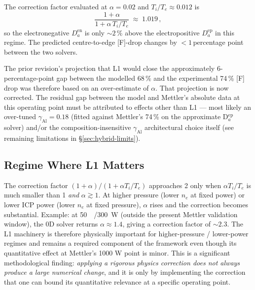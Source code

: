 The correction factor evaluated at $\alpha = 0.02$ and $T_i/T_e \approx
0.012$ is
\[
  \frac{1+\alpha}{1+\alpha\,T_i/T_e} \;\approx\; 1.019\,,
\]
so the electronegative $D_a^\mathrm{en}$ is only $\sim 2\,\%$ above the
electropositive $D_a^\mathrm{ep}$ in this regime.  The predicted
centre-to-edge [F]-drop changes by ${<}1$\,percentage point between the
two solvers.

The prior revision's projection that L1 would close the approximately
6-percentage-point gap between the modelled 68\,\% and the experimental
74\,\% [F] drop was therefore based on an over-estimate of $\alpha$.  That
projection is now corrected.  The residual gap between the model and
Mettler's absolute data at this operating point must be attributed to
effects other than L1 --- most likely an over-tuned
$\gamma_\mathrm{Al} = 0.18$ (fitted against Mettler's 74\,\% on the
approximate D$_a^\mathrm{ep}$ solver) and/or the composition-insensitive
$\gamma_\mathrm{Al}$ architectural choice itself (see remaining
limitations in \S\ref{sec:hybrid-limits}).

\subsection{Regime Where L1 Matters}

The correction factor $(1+\alpha)/(1+\alpha T_i/T_e)$ approaches 2 only
when $\alpha T_i/T_e$ is much smaller than 1 \emph{and} $\alpha \gtrsim 1$.
At higher pressure (lower $n_e$ at fixed power) or lower ICP power (lower
$n_e$ at fixed pressure), $\alpha$ rises and the correction becomes
substantial.  Example: at \SI{50}{\milli\torr}/\SI{300}{\watt} (outside the
present Mettler validation window), the 0D solver returns $\alpha \approx
1.4$, giving a correction factor of $\sim 2.3$.  The L1 machinery is
therefore physically important for higher-pressure / lower-power regimes
and remains a required component of the framework even though its
quantitative effect at Mettler's 1000 W point is minor.  This is a
significant methodological finding: \emph{applying a rigorous physics
correction does not always produce a large numerical change}, and it is
only by implementing the correction that one can bound its quantitative
relevance at a specific operating point.
